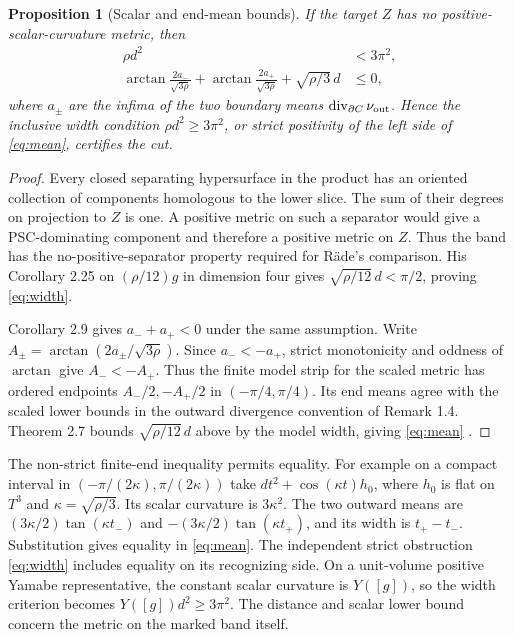\documentclass[11pt,letterpaper]{article}
\numberwithin{equation}{section}
\newtheorem{proposition}[theorem]{Proposition}
\theoremstyle{remark}
\DeclareMathOperator{\divg}{div}
\begin{document}
\begin{proposition}[Scalar and end-mean bounds]\label{prop:band}
If the target \(Z\) has no positive-scalar-curvature metric,
then
\begin{align}
 \rho d^2&<3\pi^2,\label{eq:width}\\
 \arctan\frac{2a_-}{\sqrt{3\rho}}+
 \arctan\frac{2a_+}{\sqrt{3\rho}}+
 \sqrt{\rho/3}\,d&\le0,\label{eq:mean}
\end{align}
where \(a_\pm\) are the infima of the two boundary means
\(\divg_{\partial C}\nu_{\rm out}\). Hence the inclusive
width condition \(\rho d^2\ge3\pi^2\), or strict positivity
of the left side of \eqref{eq:mean}, certifies the cut.
\end{proposition}
\begin{proof}
Every closed separating hypersurface in the product has an
oriented collection of components homologous to the lower
slice. The sum of their degrees on projection to \(Z\) is
one. A positive metric on such a separator would give a
PSC-dominating component and therefore a positive metric on
\(Z\). Thus the band has the no-positive-separator property
required for R\"ade's comparison. His Corollary 2.25 on
\((\rho/12)g\) in dimension four gives
\(\sqrt{\rho/12}\,d<\pi/2\), proving \eqref{eq:width}.

Corollary 2.9 gives \(a_-+a_+<0\) under the same assumption.
Write \(A_\pm=\arctan(2a_\pm/\sqrt{3\rho})\).
Since \(a_-<-a_+\), strict monotonicity and oddness
of \(\arctan\) give \(A_-<-A_+\). Thus the finite model strip
for the scaled metric has ordered endpoints
\(A_-/2,-A_+/2\) in \((-\pi/4,\pi/4)\).
Its end means agree with the scaled lower bounds in the
outward divergence convention of Remark 1.4. Theorem 2.7
bounds \(\sqrt{\rho/12}\,d\) above by the model width,
giving \eqref{eq:mean}
\cite[Remark 1.4, Theorems 2.7--2.8, Corollaries 2.9 and 2.25, and Lemma 6.3]{Raede2022Bands}.
\end{proof}

The non-strict finite-end inequality permits equality.
For example on a compact interval in
\((-\pi/(2\kappa),\pi/(2\kappa))\) take
\(dt^2+\cos(\kappa t)h_0\), where \(h_0\) is flat on \(T^3\)
and \(\kappa=\sqrt{\rho/3}\).
Its scalar curvature is \(3\kappa^2\).
The two outward means are
\((3\kappa/2)\tan(\kappa t_-)\) and
\(-(3\kappa/2)\tan(\kappa t_+)\), and its width is \(t_+-t_-\).
Substitution gives equality in \eqref{eq:mean}. The independent
strict obstruction \eqref{eq:width} includes equality on
its recognizing side. On a unit-volume positive Yamabe
representative, the constant scalar curvature is \(Y([g])\),
so the width criterion becomes \(Y([g])d^2\ge3\pi^2\).
The distance and scalar lower bound concern the metric on
the marked band itself.
\end{document}
